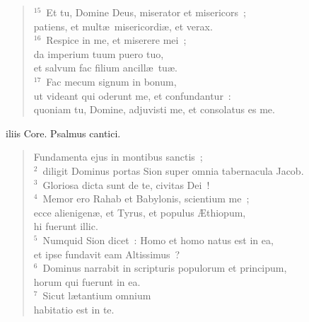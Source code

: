 \begin{flushleft}
\begin{verse}
${}^{15}$~Et tu, Domine Deus, miserator et misericors~;\\ patiens, et mult\ae\ misericordi\ae , et verax.\\
${}^{16}$~Respice in me, et miserere mei~;\\ da imperium tuum puero tuo,\\ et salvum fac filium ancill\ae\ tu\ae .\\
${}^{17}$~Fac mecum signum in bonum,\\ ut videant qui oderunt me, et confundantur~:\\ quoniam tu, Domine, adjuvisti me, et consolatus es me.\end{verse}\end{flushleft}



\bchapter
{}iliis Core. Psalmus cantici. \begin{flushleft}\begin{verse}\vspace{6pt}Fundamenta ejus in montibus sanctis~;\\
${}^{2}$~diligit Dominus portas Sion super omnia tabernacula Jacob.\\
${}^{3}$~Gloriosa dicta sunt de te, civitas Dei~!\\
${}^{4}$~Memor ero Rahab et Babylonis, scientium me~;\\ ecce alienigen\ae , et Tyrus, et populus \AE thiopum,\\ hi fuerunt illic.\\
${}^{5}$~Numquid Sion dicet~: Homo et homo natus est in ea,\\ et ipse fundavit eam Altissimus~?\\
${}^{6}$~Dominus narrabit in scripturis populorum et principum,\\ horum qui fuerunt in ea.\\
${}^{7}$~Sicut l\ae tantium omnium\\ habitatio est in te.\end{verse}\end{flushleft}



